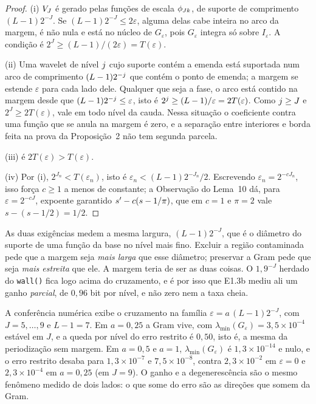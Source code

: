 \documentclass[11pt,a4paper]{article}
\newcommand{\lmin}{\lambda_{\min}}
\newcommand{\eps}{\varepsilon}
\newcommand{\Ieps}{I_{\eps}}
\begin{document}
\begin{proof}
(i) $V_{J}$ é gerado pelas funções de escala $\phi_{Jk}$, de suporte de
comprimento $(L-1)2^{-J}$. Se $(L-1)2^{-J}\le 2\eps$, alguma delas cabe
inteira no arco da margem, é não nula e está no núcleo de $G_{\eps}$, pois
$G_{\eps}$ integra só sobre $\Ieps$. A condição é $2^{J}\ge(L-1)/(2\eps) =
T(\eps)$.

(ii) Uma wavelet de nível $j$ cujo suporte contém a emenda está suportada
num arco de comprimento $(L-1)2^{-j}$ que contém o ponto de emenda; a
margem se estende $\eps$ para cada lado dele. Qualquer que seja a fase, o
arco está contido na margem desde que $(L-1)2^{-\lev}\le\eps$, isto é
$2^{\lev}\ge(L-1)/\eps = 2T(\eps)$. Como $j\ge J$ e $2^{J}\ge 2T(\eps)$,
vale em todo nível da cauda. Nessa situação o coeficiente contra uma função
que se anula na margem é zero, e a separação entre interiores e borda feita na
prova da Proposição~2 não tem segunda parcela.

(iii) é $2T(\eps) > T(\eps)$.

(iv) Por (i), $2^{J_{n}} < T(\eps_{n})$, isto é
$\eps_{n} < (L-1)2^{-J_{n}}/2$. Escrevendo $\eps_{n} = 2^{-cJ_{n}}$, isso
força $c \ge 1$ a menos de constante; a Observação do Lema~10 dá, para
$\eps = 2^{-cJ}$, expoente garantido $s' - c(s-1/\pi)$, que em $c = 1$ e
$\pi = 2$ vale $s - (s-1/2) = 1/2$.
\end{proof}

\begin{remark}\label{rem:zero}
As duas exigências medem a mesma largura, $(L-1)2^{-J}$, que é o diâmetro do
suporte de uma função da base no nível mais fino. Excluir a região
contaminada pede que a margem seja \emph{mais larga} que esse diâmetro;
preservar a Gram pede que seja \emph{mais estreita} que ele. A margem teria de
ser as duas coisas. O $1{,}9^{-J}$ herdado do \texttt{wall()} fica logo acima
do cruzamento, e é por isso que E1.3b mediu ali um ganho \emph{parcial}, de
$0{,}96$ bit por nível, e não zero nem a taxa cheia.

A conferência numérica exibe o cruzamento na família
$\eps = a\,(L-1)2^{-J}$, com $J = 5,\dots,9$ e $L - 1 = 7$. Em $a = 0{,}25$ a
Gram vive, com $\lmin(G_{\eps}) = 3{,}5\times 10^{-4}$ estável em $J$, e a
queda por nível do erro restrito é $0{,}50$, isto é, a mesma da periodização
sem margem. Em $a = 0{,}5$ e $a = 1$, $\lmin(G_{\eps})$ é
$1{,}3\times10^{-14}$ e nulo, e o erro restrito desaba para
$1{,}3\times10^{-7}$ e $7{,}5\times10^{-8}$, contra
$2{,}3\times10^{-2}$ em $\eps = 0$ e $2{,}3\times10^{-4}$ em $a = 0{,}25$
(em $J = 9$). O ganho e a degenerescência são o mesmo fenômeno medido de
dois lados: o que some do erro são as direções que somem da Gram.
\end{remark}
\end{document}
